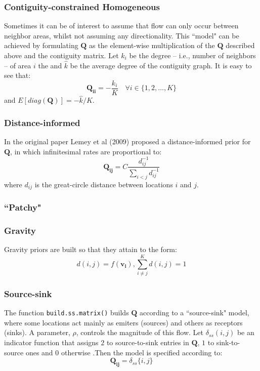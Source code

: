 \documentclass[a4paper,10pt]{article}
\begin{document}
\subsubsection{Contiguity-constrained Homogeneous}
\indent Sometimes it can be of interest to assume that flow can only occur between neighbor areas, whilst not assuming any directionality. This ``model" can be achieved by formulating $\mathbf{Q}$ as the element-wise multiplication of the  $\mathbf{Q}$ described above and the contiguity matrix. Let $k_i$ be the degree -- i.e., number of neighbors -- of area $i$ the and $\hat{k}$ be the average degree of the contiguity graph. It is easy to see that:
\begin{equation}
\mathbf{Q_{ii}} = -\frac{k_i}{K} \quad \forall i \in \{1,2,\ldots,K\} 
\end{equation}
and $E[diag(\mathbf{Q})] = - \hat{k}/K$.\\
\subsubsection{Distance-informed}
\indent In the original paper Lemey et al (2009) \cite{Lemey2009} proposed a distance-informed prior for $\mathbf{Q}$, in which infinitesimal rates are proportional to:
\begin{equation}
 \mathbf{Q_{ij}} = C\frac{d_{ij}^{-1}}{\sum_{i<j}d_{ij}^{-1}}
\end{equation}
where $d_{ij}$ is the great-circle distance between locations $i$ and $j$.\\ 
\subsubsection{``Patchy"}
\subsubsection{Gravity}
Gravity priors are built so that they attain to the form:
\begin{equation}
 d(i,j) = f(\mathbf{v_i}), \sum_{i\neq j}^K{d(i,j)} = 1
\label{gravity}
\end{equation}
\subsubsection{Source-sink}
\indent The function \verb|build.ss.matrix()| builds $\mathbf{Q}$ according to a ``source-sink" model, where some locations act mainly as emiters (sources) and others as receptors (sinks). A parameter, $\rho$, controls the magnitude of this flow. Let $\delta_{ss}(i,j)$ be an indicator function that assigns $2$ to source-to-sink entries in $\mathbf{Q}$, $1$ to sink-to-source ones and $0$ otherwise .Then the model is specified according to:
\begin{equation}
 \mathbf{Q_{ij}} =  \delta_{ss}\{i,j\}
\end{equation}
\end{document}
